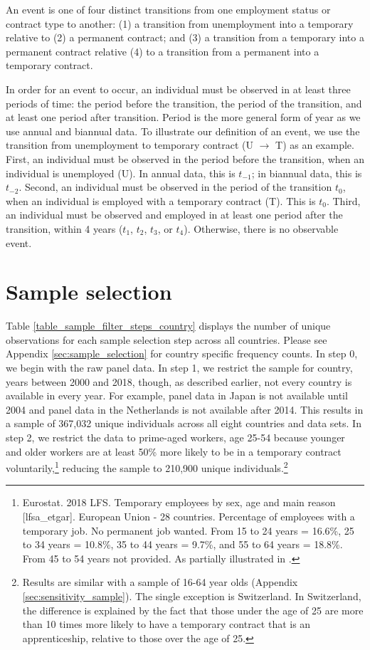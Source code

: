 \documentclass[12pt]{article}
\begin{document}
An event is one of four distinct transitions from one employment status or contract type to another: (1) a transition from unemployment into a temporary relative to (2) a permanent contract; and (3) a transition from a temporary into a permanent contract relative (4) to a transition from a permanent into a temporary contract.  

In order for an event to occur, an individual must be observed in at least three periods of time: the period before the transition, the period of the transition, and at least one period after transition.  Period is the more general form of year as we use annual and biannual data.  To illustrate our definition of an event, we use the transition from unemployment to temporary contract (U $\rightarrow$ T) as an example.  First, an individual must be observed in the period before the transition, when an individual is unemployed (U).  In annual data, this is $t_{-1}$; in biannual data, this is $t_{-2}$.  Second, an individual must be observed in the period of the transition $t_{0}$, when an individual is employed with a temporary contract (T).  This is $t_{0}$.  Third, an individual must be observed and employed in at least one period after the transition, within 4 years ($t_{1}$, $t_{2}$, $t_{3}$, or $t_{4}$).   Otherwise, there is no observable event.  

\section{Sample selection}

Table \ref{table_sample_filter_steps_country} displays the number of unique observations for each sample selection step across all countries.  Please see Appendix \ref{sec:sample_selection} for country specific frequency counts.  In step 0, we begin with the raw panel data.  In step 1, we restrict the sample for country, years between 2000 and 2018, though, as described earlier, not every country is available in every year.  For example, panel data in Japan is not available until 2004 and panel data in the Netherlands is not available after 2014.  This results in a sample of 367,032 unique individuals across all eight countries and data sets.  In step 2, we restrict the data to prime-aged workers, age 25-54 because younger and older workers are at least 50\% more likely to be in a temporary contract voluntarily,\footnote{Eurostat.  2018 LFS.  Temporary employees by sex, age and main reason [lfsa\_etgar].  European Union - 28 countries.  Percentage of employees with a temporary job.  No permanent job wanted.  From 15 to 24 years = 16.6\%, 25 to 34 years = 10.8\%, 35 to 44 years = 9.7\%, and 55 to 64 years = 18.8\%.  From 45 to 54 years not provided.  As partially illustrated in \citealp[fig. 22]{eurofound_2020}.} reducing the sample to 210,900 unique individuals.\footnote{Results are similar with a sample of 16-64 year olds (Appendix \ref{sec:sensitivity_sample}).  The single exception is Switzerland. In Switzerland, the difference is explained by the fact that those under the age of 25 are more than 10 times more likely to have a temporary contract that is an apprenticeship, relative to those over the age of 25.}   
\end{document}
